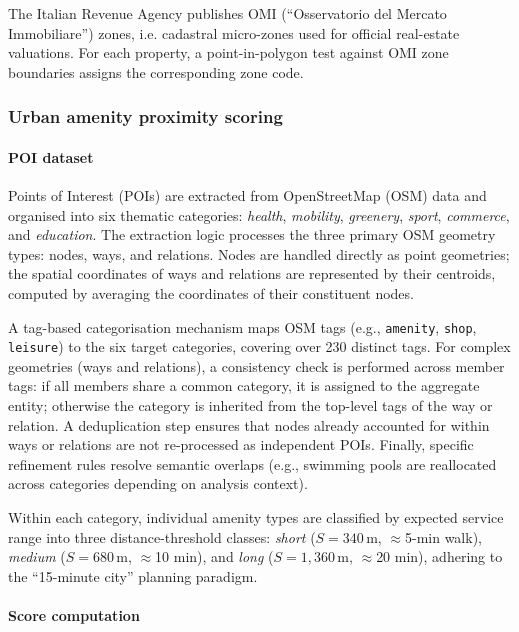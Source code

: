 \documentclass[runningheads,orivec]{llncs}
\begin{document}
The Italian Revenue Agency publishes OMI (``Osservatorio del Mercato Immobiliare'') zones, i.e. cadastral micro-zones used for official real-estate valuations.
For each property, a point-in-polygon test against
OMI zone boundaries assigns the corresponding zone code.

\subsubsection{Urban amenity proximity scoring}

\paragraph{POI dataset}

Points of Interest (POIs) are extracted from OpenStreetMap (OSM) data and organised
into six thematic categories: \textit{health}, \textit{mobility},
\textit{greenery}, \textit{sport}, \textit{commerce},
and \textit{education}.
The extraction logic processes the three primary OSM geometry types: nodes, ways, and
relations. Nodes are handled directly as point geometries; the spatial coordinates of
ways and relations are represented by their centroids, computed by averaging the
coordinates of their constituent nodes.

A tag-based categorisation mechanism maps OSM tags (e.g., \texttt{amenity},
\texttt{shop}, \texttt{leisure}) to the six target categories, covering over 230
distinct tags. For complex geometries (ways and relations), a consistency check is
performed across member tags: if all members share a common category, it is assigned
to the aggregate entity; otherwise the category is inherited from the top-level tags
of the way or relation. A deduplication step ensures that nodes already accounted for
within ways or relations are not re-processed as independent POIs. Finally, specific
refinement rules resolve semantic overlaps (e.g., swimming pools are reallocated
across categories depending on analysis context).

Within each category, individual amenity types are classified by expected service
range into three distance-threshold classes:
\textit{short} ($S = 340\,\text{m}$, $\approx$5-min walk),
\textit{medium} ($S = 680\,\text{m}$, $\approx$10 min), and
\textit{long} ($S = 1{,}360\,\text{m}$, $\approx$20 min),
adhering to the ``15-minute city'' planning paradigm.

\paragraph{Score computation}
\end{document}
